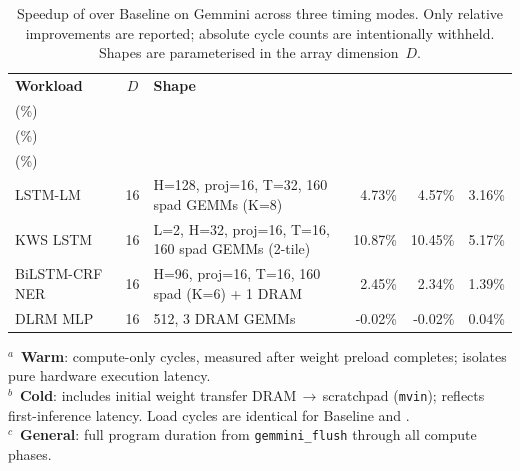 \begin{table}[t]
\centering
\caption{Speedup of \pipette{} over Baseline on Gemmini across three timing modes. Only relative improvements are reported; absolute cycle counts are intentionally withheld. Shapes are parameterised in the array dimension~$D$.}
\label{tab:benchmark_results}
\small
\setlength{\tabcolsep}{5pt}
\renewcommand{\arraystretch}{1.15}
\begin{tabular}{@{} l c l rrr @{}}
\toprule
\textbf{Workload} & \textbf{$D$} & \textbf{Shape} & \shortstack{Warm$^{a}$\\(\%)} & \shortstack{Cold$^{b}$\\(\%)} & \shortstack{General$^{c}$\\(\%)} \\
\midrule
LSTM-LM~\cite{sak_long_2014} & 16 & H=128, proj=16, T=32, 160 spad GEMMs (K=8) & 4.73\% & 4.57\% & 3.16\% \\
KWS LSTM~\cite{arik_convolutional_2017} & 16 & L=2, H=32, proj=16, T=16, 160 spad GEMMs (2-tile) & 10.87\% & 10.45\% & 5.17\% \\
BiLSTM-CRF NER~\cite{lample_neural_2016} & 16 & H=96, proj=16, T=16, 160 spad (K=6) + 1 DRAM & 2.45\% & 2.34\% & 1.39\% \\
DLRM MLP~\cite{naumov_deep_2019} & 16 & 512\textrightarrow 256\textrightarrow 64\textrightarrow 16, 3 DRAM GEMMs & -0.02\% & -0.02\% & 0.04\% \\
\bottomrule
\end{tabular}
\par\smallskip
\begin{minipage}{\linewidth}
\footnotesize
$^{a}$~\textbf{Warm}: compute-only cycles, measured after weight preload completes; isolates pure hardware execution latency.\quad \\
$^{b}$~\textbf{Cold}: includes initial weight transfer DRAM\,$\to$\,scratchpad (\texttt{mvin}); reflects first-inference latency. Load cycles are identical for Baseline and \pipette{}.\quad \\
$^{c}$~\textbf{General}: full program duration from \texttt{gemmini\_flush} through all compute phases.
\end{minipage}
\end{table}
